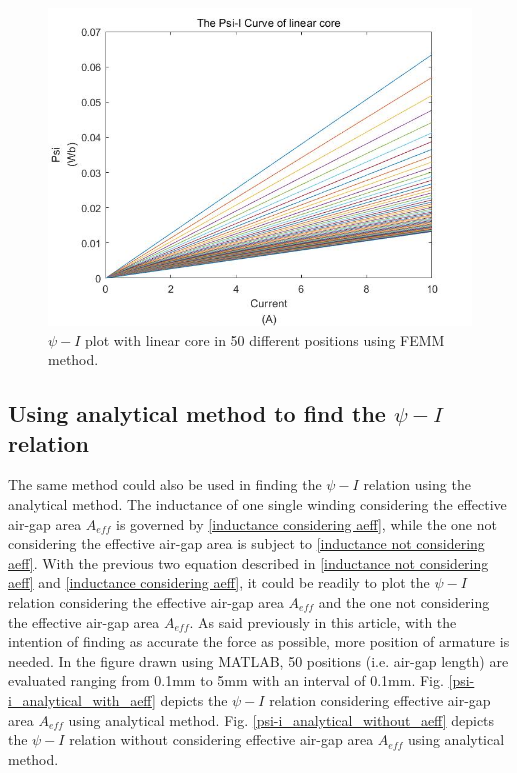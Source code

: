 \documentclass[a4paper]{IEEEtran}
\begin{document}
{\begin{figure}[!ht]
\begin{centering}
\includegraphics[scale=0.3]{psi-i_linear_full.jpg}
\par\end{centering}   
\caption{$\psi-I$ plot with linear core in 50 different positions using FEMM method.\label{psi-i_linear_full}}
\end{figure} 

\subsection{Using analytical method to find the $\psi-I$ relation}
The same method could also be used in finding the $\psi-I$ relation using the analytical method.
The inductance of one single winding considering the effective air-gap area $A_{eff}$ is governed by \eqref{inductance considering aeff},
while the one not considering the effective air-gap area is subject to \eqref{inductance not considering aeff}.
With the previous two equation described in \eqref{inductance not considering aeff} and \eqref{inductance considering aeff}, it could be readily 
to plot the $\psi-I$ relation considering the effective air-gap area $A_{eff}$ and the one not considering the effective air-gap area $A_{eff}$.
As said previously in this article, with the intention of finding as accurate the force as possible, more position of armature is needed.
In the figure drawn using MATLAB, 50 positions (i.e. air-gap length) are evaluated ranging from 0.1mm to 5mm with an interval of 0.1mm.
Fig. \ref{psi-i_analytical_with_aeff} depicts the $\psi-I$ relation considering effective air-gap area $A_{eff}$ using analytical method.
Fig. \ref{psi-i_analytical_without_aeff} depicts the $\psi-I$ relation without considering effective air-gap area $A_{eff}$ using analytical method.

}
\end{document}
